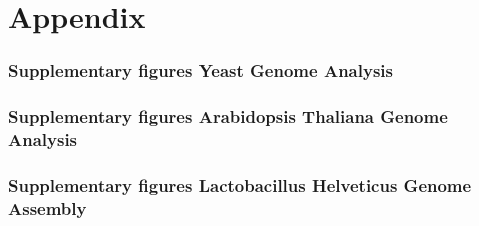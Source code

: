 \documentclass[10pt,a4paper]{article}
\begin{document}

\newpage
{}


\appendix
\part{Appendix}
\section{Supplementary figures Yeast Genome Analysis}


\section{Supplementary figures Arabidopsis Thaliana Genome Analysis}


\section{Supplementary figures Lactobacillus Helveticus Genome Assembly}
\end{document}
